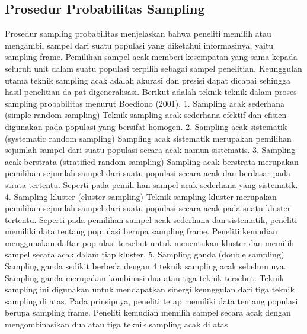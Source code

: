 \subsection{Prosedur Probabilitas Sampling}
Prosedur sampling probabilitas menjelaskan bahwa peneliti memilih atau mengambil sampel dari suatu populasi yang diketahui informasinya, yaitu sampling frame. Pemilihan sampel acak memberi kesempatan yang sama kepada seluruh unit dalam suatu populasi terpilih sebagai sampel penelitian. Keunggulan utama teknik sampling acak adalah akurasi dan presisi dapat dicapai sehingga hasil penelitian da pat digeneralisasi. Berikut adalah teknik-teknik dalam proses sampling probabilitas menurut Boediono (2001). 1. Sampling acak sederhana (simple random sampling) Teknik sampling acak sederhana efektif dan efisien digunakan pada populasi yang bersifat homogen. 2. Sampling acak sistematik (systematic random sampling) Sampling acak sistematik merupakan pemilihan sejumlah sampel dari suatu populasi secara acak namun sistematis. 3. Sampling acak berstrata (stratified random sampling) Sampling acak berstrata merupakan pemilihan sejumlah sampel dari suatu populasi secara acak dan berdasar pada strata tertentu. Seperti pada pemili han sampel acak sederhana yang sistematik. 4. Sampling kluster (cluster sampling) Teknik sampling kluster merupakan pemilihan sejumlah sampel dari suatu populasi secara acak pada suatu kluster tertentu. Seperti pada pemilihan sampel acak sederhana dan sistematik, peneliti memiliki data tentang pop ulasi berupa sampling frame. Peneliti kemudian menggunakan daftar pop ulasi tersebut untuk menentukan kluster dan memilih sampel secara acak dalam tiap kluster. 5. Sampling ganda (double sampling) Sampling ganda sedikit berbeda dengan 4 teknik sampling acak sebelum nya. Sampling ganda merupakan kombinasi dua atau tiga teknik tersebut. Teknik sampling ini digunakan untuk mendapatkan sinergi keunggulan dari tiga teknik sampling di atas. Pada prinsipnya, peneliti tetap memiliki data tentang populasi berupa sampling frame. Peneliti kemudian memilih sampel secara acak dengan mengombinasikan dua atau tiga teknik sampling acak di atas
